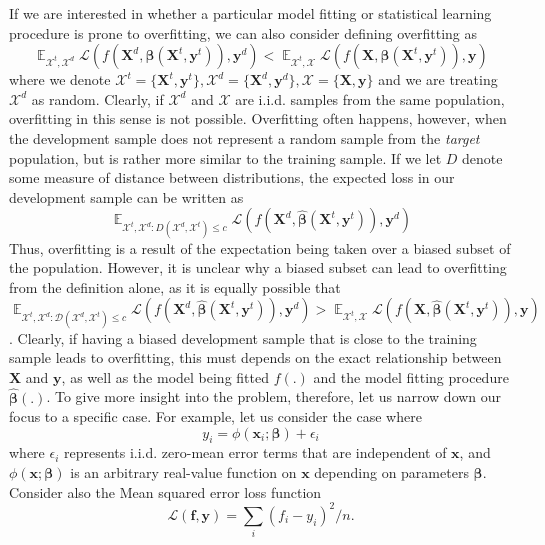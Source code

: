 \documentclass[12pt]{article}
\DeclareMathOperator{\E}{\mathbb{E}}
\begin{document}
	If we are interested in whether a particular model fitting or statistical learning procedure is prone to overfitting, we can also consider defining overfitting as 
	\begin{equation}
	\E_{\mathcal{X}^t, \mathcal{X}^d} \mathcal{L}(f(\boldsymbol{X}^d, \hat{\boldsymbol{\beta}}(\boldsymbol{X}^t, \boldsymbol{y}^t)), \boldsymbol{y}^d) < \E_{\mathcal{X}^t, \mathcal{X}} \mathcal{L} (f(\boldsymbol{X}, \hat{\boldsymbol{\beta}}(\boldsymbol{X}^t, \boldsymbol{y}^t)), \boldsymbol{y}) 
	\end{equation}
	where we denote $\mathcal{X}^t = \{ \boldsymbol{X}^t, \boldsymbol{y}^t \}, \mathcal{X}^d = \{ \boldsymbol{X}^d, \boldsymbol{y}^d \}, \mathcal{X} = \{ \boldsymbol{X}, \boldsymbol{y} \}$ and we are treating $\mathcal{X}^d$ as random. Clearly, if $\mathcal{X}^d$ and $\mathcal{X}$  are i.i.d. samples from the same population, overfitting in this sense is not possible. Overfitting often happens, however, when the development sample does not represent a random sample from the \emph{target} population, but is rather more similar to the training sample. If we let $D$ denote some measure of distance between distributions, the expected loss in our development sample can be written as
	\begin{equation}
		\E_{\mathcal{X}^t, \mathcal{X}^d: D(\mathcal{X}^d, \mathcal{X}^t) \leq c} \mathcal{L}(f(\boldsymbol{X}^d, \hat{\boldsymbol{\beta}}(\boldsymbol{X}^t, \boldsymbol{y}^t)), \boldsymbol{y}^d)
	\end{equation}
	Thus, overfitting is a result of the expectation being taken over a biased subset of the population. However, it is unclear why a biased subset can lead to overfitting from the definition alone, as it is equally possible that $\E_{\mathcal{X}^t, \mathcal{X}^d: \mathcal{D}(\mathcal{X}^d, \mathcal{X}^t) \leq c} \mathcal{L}(f(\boldsymbol{X}^d, \hat{\boldsymbol{\beta}}(\boldsymbol{X}^t, \boldsymbol{y}^t)), \boldsymbol{y}^d) > \E_{\mathcal{X}^t, \mathcal{X}} \mathcal{L} (f(\boldsymbol{X}, \hat{\boldsymbol{\beta}}(\boldsymbol{X}^t, \boldsymbol{y}^t)), \boldsymbol{y})$. Clearly, if having a biased development sample that is close to the training sample leads to overfitting, this must depends on the exact relationship between $\boldsymbol{X}$ and $\boldsymbol{y}$, as well as the model being fitted $f(.)$ and the model fitting procedure $\hat{\boldsymbol{\beta}}(.)$. To give more insight into the problem, therefore, let us narrow down our focus to a specific case. For example, let us consider the case where 
	\begin{equation}
		y_i = \phi(\boldsymbol{x}_i; \boldsymbol{\beta}) + \epsilon_i
	\end{equation}
	where $\epsilon_i$ represents i.i.d. zero-mean error terms that are independent of $\boldsymbol{x}$, and $\phi(\boldsymbol{x}; \boldsymbol{\beta})$ is an arbitrary real-value function on $\boldsymbol{x}$ depending on parameters $\boldsymbol{\beta}$. Consider also the Mean squared error loss function 
	\begin{equation}
		\mathcal{L}(\boldsymbol{f}, \boldsymbol{y}) = 	\sum_i (f_i - y_i)^2/n. 
	\end{equation}
	
\end{document}
